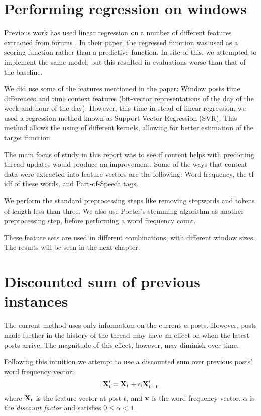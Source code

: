\section{Performing regression on windows}
Previous work has used linear regression on a number of different features 
extracted from forums \cite{Yang2009}. In their paper, the regressed function 
was used as a scoring function rather than a predictive function. In site of 
this, we attempted to implement the same model, but this resulted in evaluations 
worse than that of the baseline.

We did use some of the features mentioned in the paper: Window posts time 
differences and time context features (bit-vector representations of the day of 
the week and hour of the day). However, this time in stead of linear regression, 
we used a regression method known as Support Vector Regression (SVR). This 
method allows the using of different kernels, allowing for better estimation of 
the target function.

The main focus of study in this report was to see if content helps with 
predicting thread updates would produce an improvement. Some of the ways that 
content data were extracted into feature vectors are the following: Word 
frequency, the tf-idf of these words, and Part-of-Speech tags.

We perform the standard preprocessing steps like removing stopwords and tokens 
of length less than three. We also use Porter's stemming algorithm as another 
preprocessing step, before performing a word frequency count.

These feature sets are used in different combinations, with different window 
sizes. The results will be seen in the next chapter.

\section{Discounted sum of previous instances}
The current method uses only information on the current $w$ posts. However, 
posts made further in the history of the thread may have an effect on when the 
latest posts arrive. The magnitude of this effect, however, may diminish over 
time.

Following this intuition we attempt to use a discounted sum over previous posts' 
word frequency vector:
\[
	\mathbf{X}'_t = \mathbf{X}_t + \alpha \mathbf{X}'_{t-1}
\]
where $\mathbf{X}_t$ is the feature vector at post $t$, and $\mathbf{v}$ is the word 
frequency vector. $\alpha$ is the \emph{discount factor} and satisfies $0 \leq 
\alpha < 1$.

